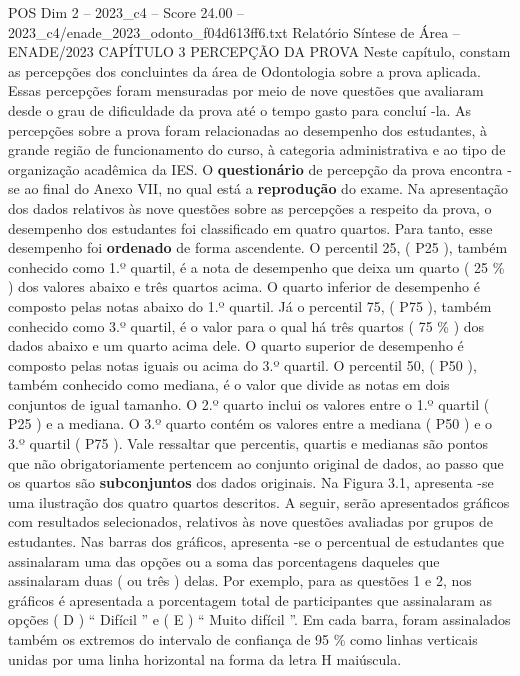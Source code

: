 \begin{textsample}{POS Dim 2 – 2023\_c4 – Score 24.00 – 2023\_c4/enade\_2023\_odonto\_f04d613ff6.txt}  \label{ex:f2_pos_008}
Relatório Síntese de Área – ENADE/2023 CAPÍTULO 3 PERCEPÇÃO DA PROVA Neste capítulo, constam as percepções dos concluintes da área de Odontologia sobre a prova aplicada.
Essas percepções foram mensuradas por meio de nove questões que avaliaram desde o grau de dificuldade da prova até o tempo gasto para concluí -la.
As percepções sobre a prova foram relacionadas ao desempenho dos estudantes, à grande região de funcionamento do curso, à categoria administrativa e ao tipo de organização acadêmica da IES.
O \textbf{questionário} de percepção da prova encontra -se ao final do Anexo VII, no qual está a \textbf{reprodução} do exame.
Na apresentação dos dados relativos às nove questões sobre as percepções a respeito da prova, o desempenho dos estudantes foi classificado em quatro quartos.
Para tanto, esse desempenho foi \textbf{ordenado} de forma ascendente.
O percentil 25, ( P25 ), também conhecido como 1.º quartil, é a nota de desempenho que deixa um quarto ( 25 \% ) dos valores abaixo e três quartos acima.
O quarto inferior de desempenho é composto pelas notas abaixo do 1.º quartil.
Já o percentil 75, ( P75 ), também conhecido como 3.º quartil, é o valor para o qual há três quartos ( 75 \% ) dos dados abaixo e um quarto acima dele.
O quarto superior de desempenho é composto pelas notas iguais ou acima do 3.º quartil.
O percentil 50, ( P50 ), também conhecido como mediana, é o valor que divide as notas em dois conjuntos de igual tamanho.
O 2.º quarto inclui os valores entre o 1.º quartil ( P25 ) e a mediana.
O 3.º quarto contém os valores entre a mediana ( P50 ) e o 3.º quartil ( P75 ).
Vale ressaltar que percentis, quartis e medianas são pontos que não obrigatoriamente pertencem ao conjunto original de dados, ao passo que os quartos são \textbf{subconjuntos} dos dados originais.
Na Figura 3.1, apresenta -se uma ilustração dos quatro quartos descritos.
A seguir, serão apresentados gráficos com resultados selecionados, relativos às nove questões avaliadas por grupos de estudantes.
Nas barras dos gráficos, apresenta -se o percentual de estudantes que assinalaram uma das opções ou a soma das porcentagens daqueles que assinalaram duas ( ou três ) delas.
Por exemplo, para as questões 1 e 2, nos gráficos é apresentada a porcentagem total de participantes que assinalaram as opções ( D ) “ Difícil ” e ( E ) “ Muito difícil ”.
Em cada barra, foram assinalados também os extremos do intervalo de confiança de 95 \% como linhas verticais unidas por uma linha horizontal na forma da letra H maiúscula.

\end{textsample}
